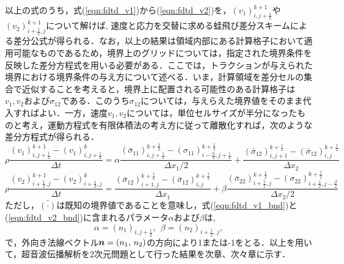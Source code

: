以上の式のうち，式(\ref{eqn:fdtd_v1})から(\ref{eqn:fdtd_v2})を，$(v_1)^{k+1}_{i,j+\frac{1}{2}}$や$(v_2)^{k+1}_{i+\frac{1}{2},j}$について解けば, 速度と応力を交替に求める蛙飛び差分スキームによる差分公式が得られる．なお，以上の結果は領域内部にある計算格子において適用可能なものであるため，境界上のグリッドについては，指定された境界条件を反映した差分方程式を用いる必要がある．ここでは，トラクションが与えられた境界における境界条件の与え方について述べる．いま，計算領域を差分セルの集合で近似することを考えると，境界上に配置される可能性のある計算格子は$v_1, v_2$および$\sigma_{12}$である．このうち$\sigma_{12}$については，与えらえた境界値をそのまま代入すればよい．一方，速度$v_1, v_2$については，単位セルサイズが半分になったものと考え，運動方程式を有限体積法の考え方に従って離散化すれば，次のような差分方程式が得られる．
\begin{equation}
	\rho \frac{(v_1)_{i,j+\frac{1}{2}}^{k+1}-(v_1)^k_{i,j+\frac{1}{2}}}{\Delta t}
	=
	\alpha
	\frac{ 
		(\bar\sigma_{11})^{k+\frac{1}{2}}_{i,j+\frac{1}{2}}
		-(\sigma_{11})^{k+\frac{1}{2}}_{i-\frac{\alpha}{2},j+\frac{1}{2}} 
	}
	{\Delta x_1/2}
	+
	\frac{(\bar \sigma_{12})^{k+\frac{1}{2}}_{i,j+1}-(\bar \sigma_{12})^{k+\frac{1}{2}}_{i,j}}{\Delta x_2}
	\label{eqn:fdtd_v1_bnd}
\end{equation}
\begin{equation}
	\rho \frac{(v_2)_{i+\frac{1}{2},j}^{k+1}-(v_2)^k_{i+\frac{1}{2},j}}{\Delta t}
	=
	\frac{(\bar\sigma_{12})^{k+\frac{1}{2}}_{i+1,j}-(\bar\sigma_{12})^{k+\frac{1}{2}}_{i,j}}{\Delta x_1}
	+
	\beta
	\frac{ 
		(\bar \sigma_{22})^{k+\frac{1}{2}}_{i+\frac{1}{2},j}
		-(\sigma_{22})^{k+\frac{1}{2}}_{i+\frac{1}{2},j-\frac{\beta}{2}} 
	}
	{\Delta x_2/2}
	\label{eqn:fdtd_v2_bnd}
\end{equation}
ただし，$\bar{(\cdot)}$は既知の境界値であることを意味し，式(\ref{eqn:fdtd_v1_bnd})と(\ref{eqn:fdtd_v2_bnd})に含まれるパラメータ$\alpha$および$\beta$は,
 \begin{equation}
	\alpha=(n_1)_{i,j+\frac{1}{2}}, \ \ \beta=(n_2)_{i+\frac{1}{2},\, j},
	\label{eqn:def_ab}
\end{equation}
で，外向き法線ベクトル$\mbox{\boldmath $n$}=(n_1,\, n_2)$の方向により1または-1をとる．以上を用いて，超音波伝播解析を2次元問題として行った結果を次章、次々章に示す．
